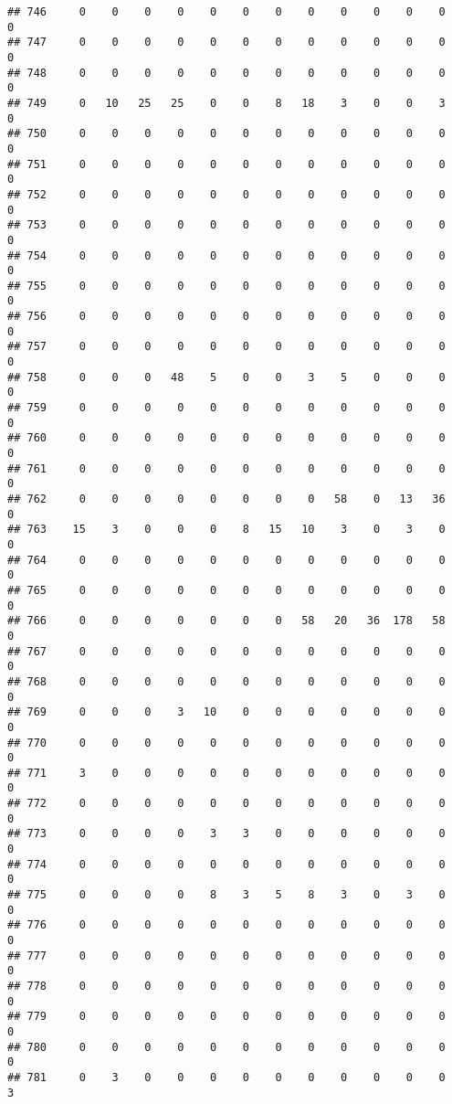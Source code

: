 \documentclass[]{article}
\begin{document}
\begin{verbatim}
## 746     0    0    0    0    0    0    0    0    0    0    0    0    0
## 747     0    0    0    0    0    0    0    0    0    0    0    0    0
## 748     0    0    0    0    0    0    0    0    0    0    0    0    0
## 749     0   10   25   25    0    0    8   18    3    0    0    3    0
## 750     0    0    0    0    0    0    0    0    0    0    0    0    0
## 751     0    0    0    0    0    0    0    0    0    0    0    0    0
## 752     0    0    0    0    0    0    0    0    0    0    0    0    0
## 753     0    0    0    0    0    0    0    0    0    0    0    0    0
## 754     0    0    0    0    0    0    0    0    0    0    0    0    0
## 755     0    0    0    0    0    0    0    0    0    0    0    0    0
## 756     0    0    0    0    0    0    0    0    0    0    0    0    0
## 757     0    0    0    0    0    0    0    0    0    0    0    0    0
## 758     0    0    0   48    5    0    0    3    5    0    0    0    0
## 759     0    0    0    0    0    0    0    0    0    0    0    0    0
## 760     0    0    0    0    0    0    0    0    0    0    0    0    0
## 761     0    0    0    0    0    0    0    0    0    0    0    0    0
## 762     0    0    0    0    0    0    0    0   58    0   13   36    0
## 763    15    3    0    0    0    8   15   10    3    0    3    0    0
## 764     0    0    0    0    0    0    0    0    0    0    0    0    0
## 765     0    0    0    0    0    0    0    0    0    0    0    0    0
## 766     0    0    0    0    0    0    0   58   20   36  178   58    0
## 767     0    0    0    0    0    0    0    0    0    0    0    0    0
## 768     0    0    0    0    0    0    0    0    0    0    0    0    0
## 769     0    0    0    3   10    0    0    0    0    0    0    0    0
## 770     0    0    0    0    0    0    0    0    0    0    0    0    0
## 771     3    0    0    0    0    0    0    0    0    0    0    0    0
## 772     0    0    0    0    0    0    0    0    0    0    0    0    0
## 773     0    0    0    0    3    3    0    0    0    0    0    0    0
## 774     0    0    0    0    0    0    0    0    0    0    0    0    0
## 775     0    0    0    0    8    3    5    8    3    0    3    0    0
## 776     0    0    0    0    0    0    0    0    0    0    0    0    0
## 777     0    0    0    0    0    0    0    0    0    0    0    0    0
## 778     0    0    0    0    0    0    0    0    0    0    0    0    0
## 779     0    0    0    0    0    0    0    0    0    0    0    0    0
## 780     0    0    0    0    0    0    0    0    0    0    0    0    0
## 781     0    3    0    0    0    0    0    0    0    0    0    0    3

\end{verbatim}
\end{document}
